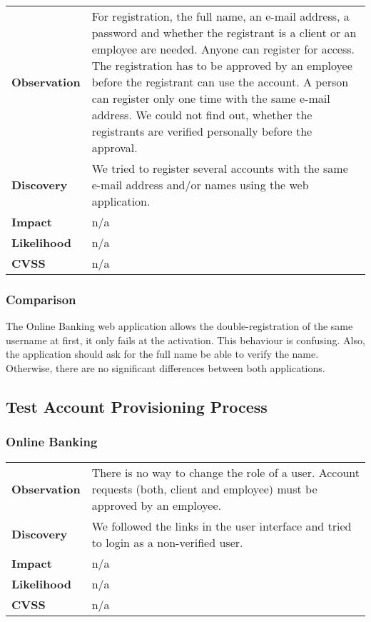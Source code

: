\begin{tabular}{l|p{10cm}}

\textbf{Observation} & For registration, the full name, an e-mail address, a password and whether the registrant is a client or an employee are needed. Anyone can register for access. The registration has to be approved by an employee before the registrant can use the account. A person can register only one time with the same e-mail address. We could not find out, whether the registrants are verified personally before the approval. \\
\textbf{Discovery} & We tried to register several accounts with the same e-mail address and/or names using the web application. \\
\textbf{Impact} & n/a \\
\textbf{Likelihood} & n/a \\
\textbf{CVSS} & n/a \\
\end{tabular}

\subsubsection*{Comparison}
The Online Banking web application allows the double-registration of the same username at first, it only fails at the activation. This behaviour is confusing. Also, the application should ask for the full name be able to verify the name. Otherwise, there are no significant differences between both applications.

\clearpage



\subsection{Test Account Provisioning Process}

\subsubsection*{Online Banking}

\begin{tabular}{l|p{10cm}}

\textbf{Observation} & There is no way to change the role of a user. Account requests (both, client and employee) must be approved by an employee.  \\
\textbf{Discovery} & We followed the links in the user interface and tried to login as a non-verified user. \\
\textbf{Impact} & n/a \\
\textbf{Likelihood} & n/a \\
\textbf{CVSS} & n/a \\
\end{tabular}

